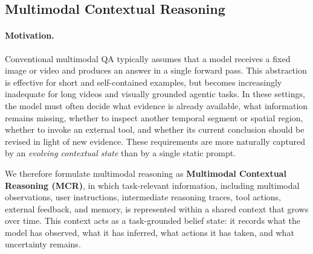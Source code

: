 \documentclass[11pt, letterpaper]{template}
\theoremstyle{plain}
\theoremstyle{definition}
\theoremstyle{remark}
\begin{document}
\subsection{Multimodal Contextual Reasoning}

\paragraph{Motivation.}
Conventional multimodal QA typically assumes that a model receives a fixed image or video and produces an answer in a single forward pass. This abstraction is effective for short and self-contained examples, but becomes increasingly inadequate for long videos and visually grounded agentic tasks. In these settings, the model must often decide what evidence is already available, what information remains missing, whether to inspect another temporal segment or spatial region, whether to invoke an external tool, and whether its current conclusion should be revised in light of new evidence. These requirements are more naturally captured by an \emph{evolving contextual state} than by a single static prompt.

We therefore formulate multimodal reasoning as \textbf{Multimodal Contextual Reasoning (MCR)}, in which task-relevant information, including multimodal observations, user instructions, intermediate reasoning traces, tool actions, external feedback, and memory, is represented within a shared context that grows over time. This context acts as a task-grounded belief state: it records what the model has observed, what it has inferred, what actions it has taken, and what uncertainty remains.
\end{document}
